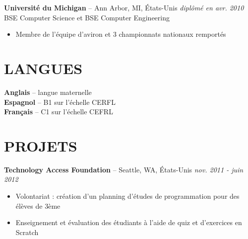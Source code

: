 \documentclass[]{rob-keim-resume}
\begin{document}
	{\bf Université du Michigan} -- Ann Arbor, MI, États-Unis \hfill {\sl diplômé en avr. 2010} \\
	BSE Computer Science et BSE Computer Engineering
	\begin{itemize} \itemsep -2pt
		\item Membre de l’équipe d’aviron et 3 championnats nationaux remportés
	\end{itemize}
	
	\section{LANGUES}
	
	{\bf Anglais} -- langue maternelle \\
	{\bf Espagnol} -- B1 sur l'échelle CERFL \\
	{\bf Français} -- C1 sur l'échelle CEFRL
	
	\section{PROJETS}
	
	{\bf Technology Access Foundation} --  Seattle, WA, États-Unis \hfill {\sl nov. 2011 - juin 2012} 
	\begin{itemize} \itemsep -2pt
		\item Volontariat : création d'un planning d’études de programmation pour des élèves de 3ème
		\item Enseignement et évaluation des étudiants à l'aide de quiz et d'exercices en Scratch
	\end{itemize}
\end{document}
